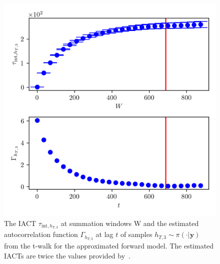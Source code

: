 \begin{figure}[ht!]
	\centering
	\includegraphics{UwerrTauIntTWalk6.png}
	\caption[IACT and autocorrelation function of samples $h_{T,3} \sim \pi(\cdot|\bm{y})$, for approximated model.]{The IACT $\tau_{\text{int},h_{T,3}}$ at summation windows W and the estimated autocorrelation function $\Gamma_{h_{T,3}}$ at lag $t$ of samples $h_{T,3} \sim \pi( \cdot| \bm{y})$ from the t-walk for the approximated forward model.
	The estimated IACTs are twice the values provided by~\cite{drikHesse, UwerrM}.}
	\label{fig:TWalkIATC7}
\end{figure}

